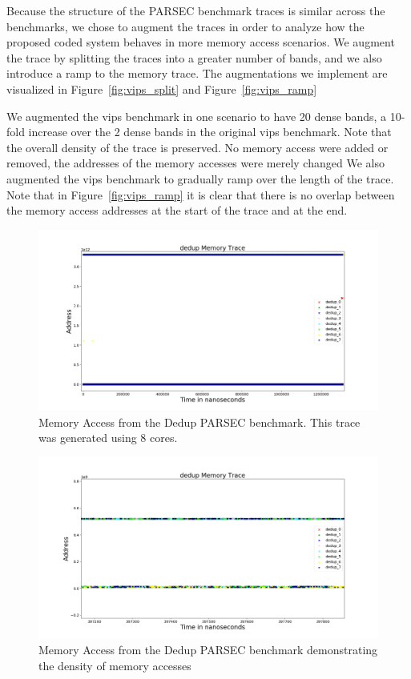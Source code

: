 Because the structure of the PARSEC benchmark traces is similar across the benchmarks, we chose to augment the traces in order to analyze how the proposed coded system behaves in more memory access scenarios. We augment the trace by splitting the traces into a greater number of bands, and we also introduce a ramp to the memory trace. The augmentations we implement are visualized in Figure~\ref{fig:vips_split} and Figure~\ref{fig:vips_ramp}

We augmented the vips benchmark in one scenario to have 20 dense bands, a 10-fold increase over the 2 dense bands in the original vips benchmark. Note that the overall density of the trace is preserved. No memory access were added or removed, the addresses of the memory accesses were merely changed We also augmented the vips benchmark to gradually ramp over the length of the trace. Note that in Figure~\ref{fig:vips_ramp} it is clear that there is no overlap between the memory access addresses at the start of the trace and at the end.


\begin{figure}[h!]

		\includegraphics[width=\linewidth]{figures/dedup_whole.png}
		\caption{Memory Access from the Dedup PARSEC benchmark. This trace was generated using 8 cores.}
		\label{fig:dedup_whole}
\end{figure}

\begin{figure}[h!]
		\includegraphics[width=\linewidth]{figures/dedup_dense.png}
		\caption{Memory Access from the Dedup PARSEC benchmark demonstrating the density of memory accesses}
		\label{fig:dedup_dense}
\end{figure}
		
